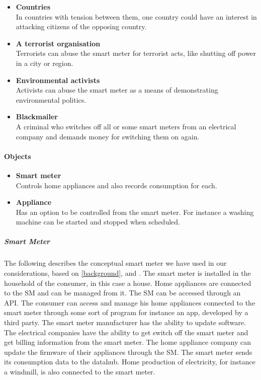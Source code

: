 \begin{itemize}
\begin{itemize}
\item \textbf{Countries}\\ In countries with tension between them, one country could have an interest in attacking citizens of the opposing country.
\item \textbf{A terrorist organisation}\\ Terrorists can abuse the smart meter for terrorist acts, like shutting off power in a city or region.
\item \textbf{Environmental activists}\\ Activists can abuse the smart meter as a means of demonstrating environmental politics.
\item \textbf{Blackmailer}\\ A criminal who switches off all or some smart meters from an electrical company and demands money for switching them on again.
\end{itemize}
\end{itemize}

\paragraph{Objects}
\begin{itemize}
\item \textbf{Smart meter}\\ Controls home appliances and also records consumption for each.
\item \textbf{Appliance}\\ Has an option to be controlled from the smart meter. For instance a washing machine can be started and stopped when scheduled.
\end{itemize}

\subparagraph{Smart Meter}
The following describes the conceptual smart meter we have used in our considerations, based on \cref{background}, \citet{tdlm} and \citet{smart_meter_survey}.
The smart meter is installed in the household of the consumer, in this case a house.
Home appliances are connected to the SM and can be managed from it.
The SM can be accessed through an API.
The consumer can access and manage his home appliances connected to the smart meter through some sort of program for instance an app, developed by a third party.
The smart meter manufacturer has the ability to update software.
The electrical companies have the ability to get switch off the smart meter and get billing information from the smart meter.
The home appliance company can update the firmware of their appliances through the SM.
The smart meter sends its consumption data to the datahub.
Home production of electricity, for instance a windmill, is also connected to the smart meter.
